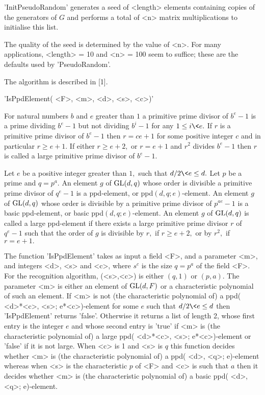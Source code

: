 'InitPseudoRandom'  generates  a seed   of  <length>  elements containing
copies of  the generators  of $G$   and  performs a total of   <n> matrix
multiplications to initialise this list.

The quality  of  the seed is  determined by  the value of  <n>.  For many
applications, <length> = 10 and <n> = 100  seem to suffice; these are the
defaults used by 'PseudoRandom'.

The algorithm is described in [1].


'IsPpdElement( <F>, <m>, <d>, <s>, <c>)'

For natural numbers   $b$ and $e$  greater  than  $1$ a   primitive prime
divisor of $b^e - 1$ is a prime dividing $b^e-1$ but not dividing $b^i-1$
for any $1 \le  i \< e.$ If $r$  is a primitive  prime divisor of $b^e-1$
then $r = ce+1$ for  some positive integer $c$  and in particular $r  \ge
e+1.$ If either $r \ge e+2,$ or $r = e+1$  and $r^2$ divides $b^e-1$ then
$r$ is called a large primitive prime divisor of $b^e-1.$

Let $e$ be a positive integer greater than  $1,$ such that  $d/2 \< e \le
d.$ Let $p$ be a prime and $q = p^a.$ An element  $g$ of ${\rm GL}(d,q)$ whose
order    is  divisible  a primitive  prime   divisor  of   $q^{e}-1$ is a
ppd-element, or  ppd$(d,  q; e)$-element.   An element  $g$ of ${\rm GL}(d,q)$
whose order is divisible by a primitive prime divisor  of $p^{ae}-1$ is a
basic ppd-element,  or basic ppd$(d, q; e)$-element.    An element $g$ of
${\rm GL}(d,q)$ is   called  a  large  ppd-element if   there exists   a large
primitive prime  divisor $r$  of $q^e-1$ such  that  the order of  $g$ is
divisible by $r,$ if $r \ge e+2,$ or by $r^2,$ if $r = e+1.$

The function 'IsPpdElement' takes  as input a  field <F>, and a parameter
<m>, and integers <d>,  <s> and <c>, where $s^c$  is the size $q =p^a$ of
the field  <F>.  For the recognition  algorithm, (<s>,<c>) is either $(q,
1)$ or $(p,a)$.  The parameter <m> is either an  element of ${\rm GL}(d,F)$ or
a characteristic  polynomial of  such an element.   If  <m> is  not  (the
characteristic polynomial of)   a ppd( <d>*<c>, <s>;  e*<c>)-element  for
some $e$ such that $d/2 \< e  \le d$ then 'IsPpdElement' returns 'false'.
Otherwise it returns a list of length 2, whose first entry is the integer
$e$ and whose   second entry is  'true' if   <m>  is (the  characteristic
polynomial of) a large ppd( <d>*<c>, <s>; e*<c>)-element or 'false' if it
is not large. When <c> is 1 and <s> is  $q$ this function decides whether
<m> is (the  characteristic polynomial  of) a  ppd( <d>, <q>;  e)-element
whereas when <s> is the  characteristic $p$ of <F>  and <c> is such  that
$a$ then it  decides whether <m> is  (the characteristic polynomial of) a
basic ppd( <d>, <q>; e)-element.

